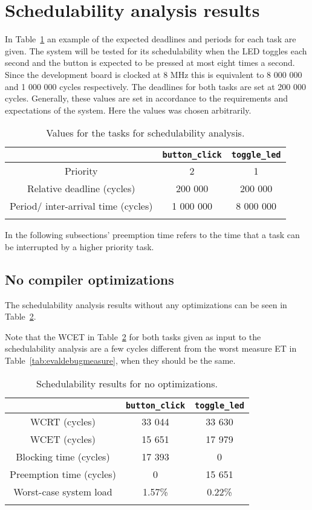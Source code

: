 \section{Schedulability analysis results}
In Table~\ref{tab:evalschedtasks} an example of the expected deadlines and
periods for each task are given. The system will be tested for its
schedulability when the LED toggles each second and the button is expected to
be pressed at most eight times a second. Since the development board is clocked
at 8 MHz this is equivalent to 8 000 000 and 1 000 000 cycles respectively. The
deadlines for both tasks are set at 200 000 cycles. Generally, these values are set
in accordance to the requirements and expectations of the system. Here the values
was chosen arbitrarily.

\begin{longtable}{|c | c | c|}
    \hline
     & \texttt{button\_click} & \texttt{toggle\_led} \\
    \hline
    Priority & 2 & 1 \\
    \hline
    Relative deadline (cycles) & 200 000 & 200 000 \\
    \hline
    Period/ inter-arrival time (cycles) & 1 000 000 & 8 000 000 \\
    \hline
\caption{Values for the tasks for schedulability analysis.}
\label{tab:evalschedtasks}
\end{longtable}

In the following subsections' preemption time refers to the time that
a task can be interrupted by a higher priority task.

\subsection{No compiler optimizations}
The schedulability analysis results without any optimizations can be seen in
Table~\ref{tab:evalscheddebug}.

Note that the WCET in Table~\ref{tab:evalscheddebug} for both tasks given as input
to the schedulability analysis are a few cycles different from the worst measure
ET in Table~\ref{tab:evaldebugmeasure}, when they should be the same.

\begin{longtable}{|c | c | c|}
    \hline
     & \texttt{button\_click} & \texttt{toggle\_led} \\
    \hline
    WCRT (cycles) & 33 044 & 33 630 \\
    \hline
    WCET (cycles) & 15 651 & 17 979 \\
    \hline
    Blocking time (cycles) & 17 393 & 0 \\
    \hline
    Preemption time (cycles) & 0 & 15 651 \\
    \hline
    Worst-case system load & 1.57\% & 0.22\% \\
    \hline
\caption{Schedulability results for no optimizations.}
\label{tab:evalscheddebug}
\end{longtable}

